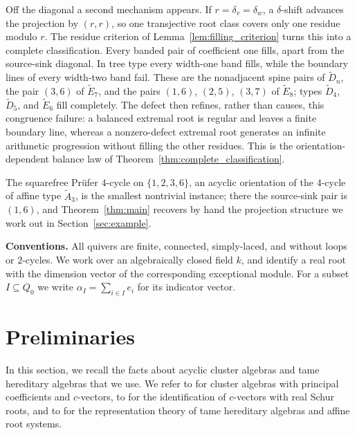 \documentclass[11pt, a4paper]{amsart}
\theoremstyle{definition}
\begin{document}
Off the diagonal a second mechanism appears. If
$r=\delta_v=\delta_w$, a $\delta$-shift advances the projection by
$(r,r)$, so one transjective root class covers only one residue modulo $r$.
The residue criterion of Lemma~\ref{lem:filling_criterion} turns this into
a complete classification. Every banded pair of coefficient one fills,
apart from the source-sink diagonal. In tree type every width-one band
fills, while the boundary lines of every width-two band fail. These are the
nonadjacent spine pairs of $\widetilde D_n$, the pair $(3,6)$ of
$\widetilde E_7$, and the pairs $(1,6)$, $(2,5)$, $(3,7)$ of
$\widetilde E_8$; types $\widetilde D_4$, $\widetilde D_5$, and
$\widetilde E_6$ fill completely. The defect then refines, rather than
causes, this congruence failure: a balanced extremal root is regular and
leaves a finite boundary line, whereas a nonzero-defect extremal root
generates an infinite arithmetic progression without filling the other
residues. This is the orientation-dependent balance law of
Theorem~\ref{thm:complete_classification}.

The squarefree Pr\"ufer $4$-cycle on $\{1, 2, 3, 6\}$, an acyclic
orientation of the $4$-cycle of affine type $\widetilde{A}_3$, is the
smallest nontrivial instance; there the source-sink pair is $(1, 6)$,
and Theorem~\ref{thm:main} recovers by hand the projection structure we
work out in Section~\ref{sec:example}.

\medskip\noindent\textbf{Conventions.}\;
All quivers are finite, connected, simply-laced, and without loops or
$2$-cycles. We work over an algebraically closed field $k$, and identify a real root
with the dimension vector of the corresponding exceptional module. For a
subset $I \subseteq Q_0$ we write $\alpha_I = \sum_{i \in I} e_i$ for its
indicator vector.

\section{Preliminaries}
\label{sec:prelim}

In this section, we recall the facts about acyclic cluster algebras and
tame hereditary algebras that we use. We refer to
\cite{FominZelevinsky2007} for cluster algebras with principal
coefficients and $c$-vectors, to \cite{NajeraChavez2013, GHKK2018} for the
identification of $c$-vectors with real Schur roots, and to
\cite{Ringel1984, Kac1990} for the representation theory of tame
hereditary algebras and affine root systems.
\end{document}

